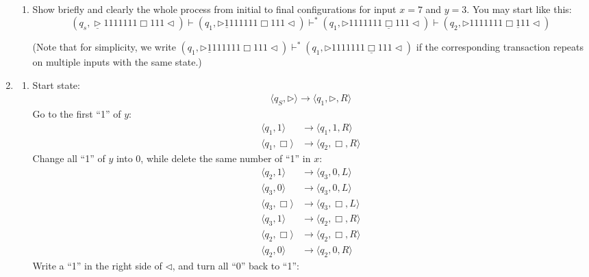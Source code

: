 \documentclass[12pt,a4paper]{article}
\makeatletter
\newtheorem*{solution}{Solution}
\theoremstyle{definition}
\renewenvironment{solution}[1][Solution] {\par\pushQED{\qed}\normalfont\topsep6\p@\@plus6\p@\relax\trivlist\item[\hskip\labelsep\bfseries#1\@addpunct{.}]\ignorespaces}{\popQED\endtrivlist\@endpefalse} \makeatother
\makeatother
\begin{document}
\begin{enumerate}
\begin{enumerate}
	\item
	Show briefly and clearly the whole process from initial to final configurations for input $x = 7$ and $y = 3$. You may start like this:
	$$(q_s,\underline{\triangleright}  1  1  1  1  1  1  1  \Box 1  1  1   \triangleleft)
	\vdash (q_1,\triangleright  \underline{1}  1  1  1  1  1  1  \Box 1  1  1   \triangleleft)
	\vdash^* (q_1,\triangleright  1  1  1  1  1  1  1  \underline{\Box} 1  1  1   \triangleleft)
	\vdash (q_2,\triangleright  1  1  1  1  1  1  1  \Box \underline{1}  1  1   \triangleleft)$$
	
	\par{\color{blue}(Note that for simplicity, we write $(q_1,\triangleright  \underline{1}  1  1  1  1  1  1  \Box 1  1  1   \triangleleft)\vdash^* (q_1,\triangleright  1  1  1  1  1  1  1  \underline{\Box} 1  1  1   \triangleleft)$ if the corresponding transaction repeats on multiple inputs with the same state.)}
\end{enumerate}
	\begin{solution}
		\begin{enumerate}
			\item 
			Start state:
			\begin{align*}
			\langle q_S, \triangleright \rangle \rightarrow \langle q_1, \triangleright,  R\rangle
			\end{align*}
			Go to the first ``1'' of $ y $:	
			\begin{align*}
				\langle q_1, 1 \rangle &\rightarrow \langle q_1, 1,  R\rangle \\
				\langle q_1, \Box \rangle &\rightarrow \langle q_2, \Box,  R\rangle
			\end{align*}
			Change all ``1'' of $ y $ into 0, while delete the same number of ``1'' in $ x $:
			\begin{align*}
				\langle q_2, 1 \rangle &\rightarrow \langle q_3, 0,  L\rangle \\
				\langle q_3, 0 \rangle &\rightarrow \langle q_3, 0,  L\rangle \\
				\langle q_3,\Box \rangle &\rightarrow \langle q_3, \Box ,  L\rangle \\
				\langle q_3,1 \rangle &\rightarrow \langle q_2, \Box ,  R\rangle \\
				\langle q_2,\Box \rangle &\rightarrow \langle q_2, \Box ,  R\rangle \\
				\langle q_2,0 \rangle &\rightarrow \langle q_2, 0 ,  R\rangle 
			\end{align*}
			Write a ``1'' in the right side of $ \triangleleft $, and turn all ``0'' back to ``1'':

\end{enumerate}
\end{solution}
\end{enumerate}
\end{document}
